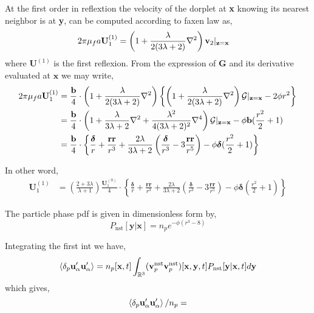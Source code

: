 At the first order in reflextion the velocity of the dorplet at \textbf{x} knowing its nearest neighbor is at \textbf{y}, can be computed according to faxen law as, 
\begin{align}
    2 \pi \mu_f a \textbf{U}_1^{(1)}
    &= \left(1 + \frac{\lambda}{2(3\lambda +2)}\mathbf{\nabla}^2\right)\textbf{v}_2|_{\textbf{z} = \textbf{x}}
\end{align}
where $\textbf{U}^{(1)}$ is the first reflexion. 
From the expression of $\mathbf{G}$ and its derivative evaluated at $\textbf{x}$ we may write, 
\begin{align}
    2 \pi \mu_f a \textbf{U}_1^{(1)}
    &= 
    \frac{\textbf{b}}{4}\cdot\left(1+ \frac{\lambda}{2(3\lambda +2)}\mathbf{\nabla}^2\right) \left\{\left(1 + \frac{\lambda}{2(3\lambda +2)}\mathbf{\nabla}^2\right)\mathcal{G}|_{\textbf{z} = \textbf{x}}  - 2 \phi r^2 \right\} \\
    &= 
    \frac{\textbf{b}}{4}\cdot\left(1+ \frac{\lambda}{3\lambda +2}\mathbf{\nabla}^2+ \frac{\lambda^2}{4(3\lambda +2)^2}\mathbf{\nabla}^4\right)\mathcal{G}|_{\textbf{z} = \textbf{x}}
    - \phi \textbf{b} (\frac{r^2}{2} +1 )\\
    &=\frac{\textbf{b}}{4}\cdot\left\{ \frac{\bm\delta}{r}+ \frac{\textbf{rr}}{r^3}+ \frac{2\lambda}{3\lambda +2} \left(
        \frac{\bm\delta}{r^3} - 3 \frac{\textbf{rr}}{r^5}
    \right)
    - \phi \bm\delta (\frac{r^2}{2} +1 )
    \right\}
\end{align}

In other word, 
\begin{align}
    \textbf{U}_1^{(1)}
    &=\left(\frac{2+3\lambda}{\lambda +1}\right)\frac{    \textbf{U}_1^{(0)}    }{4}\cdot\left\{ \frac{\bm\delta}{r}+ \frac{\textbf{rr}}{r^3}+ \frac{2\lambda}{3\lambda +2} \left(
        \frac{\bm\delta}{r^3} - 3 \frac{\textbf{rr}}{r^5}
    \right)
    - \phi \bm\delta (\frac{r^2}{2} +1 )
    \right\}
\end{align}




The particle phase pdf is given in dimensionless form by, 
\begin{equation*}
    P_\text{nst}[\textbf{y}|\textbf{x}]
    =
    n_p e^{- \phi (r^3 - 8)}
\end{equation*}

Integrating the first int we have, 
\begin{equation*}
    \left<\delta_p \textbf{u}_\alpha'\textbf{u}_\alpha'\right>
    = 
    n_p[\textbf{x},t]
    \int_{\mathbb{R}^3}
    (\textbf{v}^\text{nst}_p
    \textbf{v}^\text{nst}_p)[\textbf{x},\textbf{y},t]
    P_\text{nst}[\textbf{y}|\textbf{x},t]
    d\textbf{y}
\end{equation*}
which gives, 
\begin{equation*}
    \left<\delta_p \textbf{u}_\alpha'\textbf{u}_\alpha'\right> / n_p 
    = 
\end{equation*}